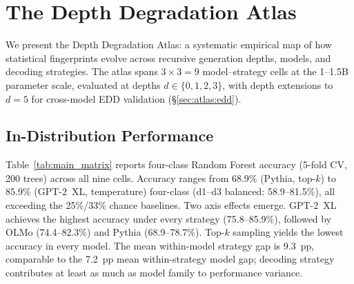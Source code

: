 \section{The Depth Degradation Atlas}
\label{sec:atlas}

We present the Depth Degradation Atlas: a systematic empirical map of how statistical fingerprints evolve across recursive generation depths, models, and decoding strategies.
The atlas spans $3 \times 3 = 9$ model--strategy cells at the 1--1.5B parameter scale, evaluated at depths $d \in \{0, 1, 2, 3\}$, with depth extensions to $d{=}5$ for cross-model EDD validation (\S\ref{sec:atlas:edd}).

\subsection{In-Distribution Performance}
\label{sec:atlas:id}

Table~\ref{tab:main_matrix} reports four-class Random Forest accuracy (5-fold CV, 200 trees) across all nine cells.
Accuracy ranges from 68.9\% (Pythia, top-$k$) to 85.9\% (GPT-2~XL, temperature) four-class (d1--d3 balanced: 58.9--81.5\%), all exceeding the 25\%/33\% chance baselines.
Two axis effects emerge.
GPT-2~XL achieves the highest accuracy under every strategy (75.8--85.9\%), followed by OLMo (74.4--82.3\%) and Pythia (68.9--78.7\%).
Top-$k$ sampling yields the lowest accuracy in every model.
The mean within-model strategy gap is 9.3~pp, comparable to the 7.2~pp mean within-strategy model gap; decoding strategy contributes at least as much as model family to performance variance.

